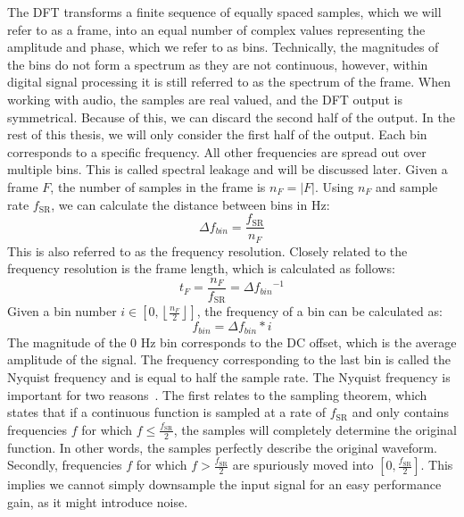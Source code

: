 \documentclass[a4paper,10pt,twocolumn]{article}
\newcommand{\floor}[1]{\left \lfloor #1 \right \rfloor}
\begin{document}
The DFT transforms a finite sequence of equally spaced samples, which we will refer to as a frame, into an equal number of complex values representing the amplitude and phase, which we refer to as bins. Technically, the magnitudes of the bins do not form a spectrum as they are not continuous, however, within digital signal processing it is still referred to as the spectrum of the frame. %
When working with audio, the samples are real valued, and the DFT output is symmetrical. Because of this, we can discard the second half of the output. In the rest of this thesis, we will only consider the first half of the output. Each bin corresponds to a specific frequency. All other frequencies are spread out over multiple bins. This is called spectral leakage and will be discussed later. Given a frame $F$, the number of samples in the frame is $n_F = |F|$. Using $n_F$ and sample rate $f_{\text{SR}}$, we can calculate the distance between bins in Hz:
\[ \Delta f_{bin} = \frac{f_{\text{SR}}}{n_F} \]
This is also referred to as the frequency resolution. Closely related to the frequency resolution is the frame length, which is calculated as follows:
\[ t_F = \frac{n_F}{f_{\text{SR}}} = \Delta f_{bin}{}^{-1} \]
Given a bin number $i \in [0, \floor{\frac{n_F}{2}}]$, the frequency of a bin can be calculated as:
\[ f_{bin} = \Delta f_{bin} * i \]
The magnitude of the 0 Hz bin corresponds to the DC offset, which is the average amplitude of the signal. The frequency corresponding to the last bin is called the Nyquist frequency and is equal to half the sample rate. The Nyquist frequency is important for two reasons~\cite{numrec}. The first relates to the sampling theorem, which states that if a continuous function is sampled at a rate of $f_{\text{SR}}$ and only contains frequencies $f$ for which $f \leq \frac{f_{\text{SR}}}{2}$, the samples will completely determine the original function. In other words, the samples perfectly describe the original waveform. Secondly, frequencies $f$ for which $f > \frac{f_{\text{SR}}}{2}$ are spuriously moved into $[0, \frac{f_{\text{SR}}}{2}]$.
This implies we cannot simply downsample the input signal for an easy performance gain, as it might introduce noise.
\end{document}
